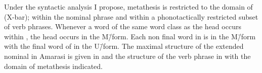 \begin{exe}
	\label{ex:130825-6, 0.36 3}
	\label{ex:130925-1, 3.32}
\end{exe}
\begin{multicols}{2}
	\begin{exe}
		\label{tr:130925-1, 3.32}
		\label{tr:130825-6, 0.36 3}
	\end{exe}
\end{multicols}

Under the syntactic analysis I propose, metathesis is restricted
to the domain of  (X-bar);  within the nominal phrase
and  within a phonotactically restricted subset of verb phrases.
Whenever a word of the same word class as the head occurs within ,
the head occurs in the M\=/form.
Each non final word in  is in the M\=/form
with the final word of  in the U\=/form.
The maximal structure of the extended nominal in Amarasi is given in 
and the structure of the verb phrase in 
with the domain of metathesis indicated.


